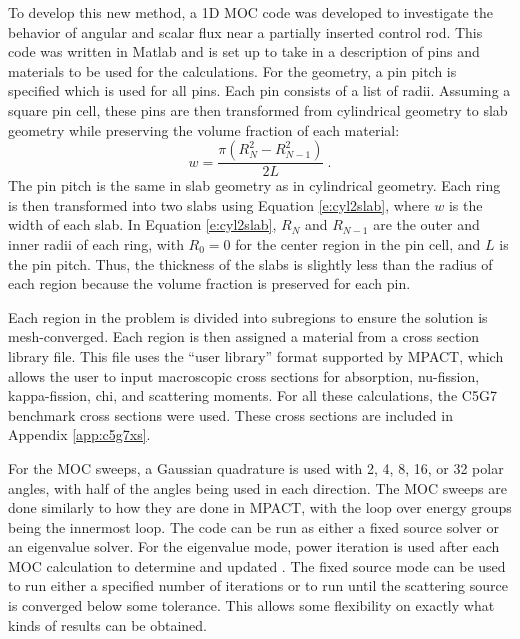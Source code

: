 To develop this new method, a 1D MOC code was developed to investigate the behavior of angular and scalar flux near a partially inserted control rod.  This code was written in Matlab \cite{MATLAB:2016} and is set up to take in a description of pins and materials to be used for the calculations.  For the geometry, a pin pitch is specified which is used for all pins.  Each pin consists of a list of radii.  Assuming a square pin cell, these pins are then transformed from cylindrical geometry to slab geometry while preserving the volume fraction of each material:
\begin{equation}\label{e:cyl2slab}
w = \frac{\pi \left(R_N^2 - R_{N-1}^2\right)}{2 L}\ .
\end{equation}
The pin pitch is the same in slab geometry as in cylindrical geometry.  Each ring is then transformed into two slabs using Equation \ref{e:cyl2slab}, where $w$ is the width of each slab.  In Equation \ref{e:cyl2slab}, $R_N$ and $R_{N-1}$ are the outer and inner radii of each ring, with $R_0=0$ for the center region in the pin cell, and $L$ is the pin pitch.  Thus, the thickness of the slabs is slightly less than the radius of each region because the volume fraction is preserved for each pin.

Each region in the problem is divided into subregions to ensure the solution is mesh-converged.  Each region is then assigned a material from a cross section library file.  This file uses the ``user library'' format supported by MPACT, which allows the user to input macroscopic cross sections for absorption, nu-fission, kappa-fission, chi, and scattering moments.  For all these calculations, the C5G7 benchmark cross sections \cite{EELewisC5G72003,EELewisC5G7extended2005} were used.  These cross sections are included in Appendix \ref{app:c5g7xs}.

For the MOC sweeps, a Gaussian quadrature \cite{HandbookOfMathFunctions1972} is used with 2, 4, 8, 16, or 32 polar angles, with half of the angles being used in each direction.  The MOC sweeps are done similarly to how they are done in MPACT, with the loop over energy groups being the innermost loop.  The code can be run as either a fixed source solver or an eigenvalue solver.  For the eigenvalue mode, power iteration is used after each MOC calculation to determine and updated \keff{}.  The fixed source mode can be used to run either a specified number of iterations or to run until the scattering source is converged below some tolerance.  This allows some flexibility on exactly what kinds of results can be obtained.

